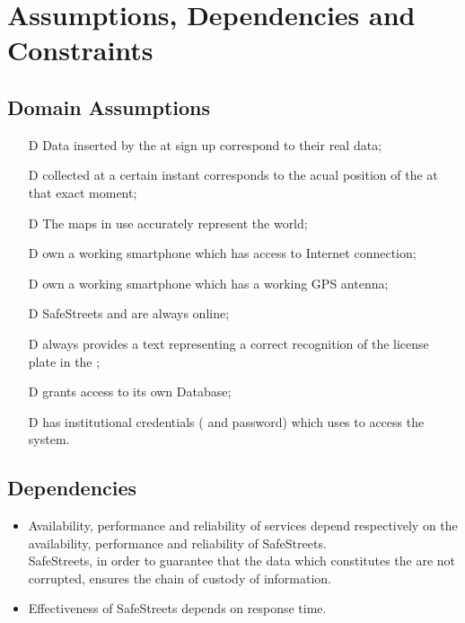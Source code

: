 \documentclass[../../RASD.tex]{subfiles}
\begin{document}
\section{Assumptions, Dependencies and Constraints}
	\subsection{Domain Assumptions}
	 	\begin{itemize}
	 		\item[D\subs{1}]Data inserted by the  at sign up correspond to their real data;
	 		\item[D\subs{2}] collected at a certain instant corresponds to the acual position of the  at that exact moment;
	 		\item[D\subs{3}]The maps in use accurately represent the world;
	 		\item[D\subs{4}] own a working smartphone which has access to Internet connection;
	 		\item[D\subs{5}] own a working smartphone which has a working GPS antenna;
	 		\item[D\subs{6}]SafeStreets and  are always online;
	 		\item[D\subs{7}] always provides a text representing a correct recognition of the license plate in the ;
	 		\item[D\subs{8}] grants access to its own  Database;
	 		\item[D\subs{9}] has institutional credentials ( and password) which uses to access the system.
	 	\end{itemize}
 	
 	\subsection{Dependencies}
 		\begin{itemize}
 		\item Availability, performance and reliability of services depend respectively on the availability, performance and reliability of SafeStreets. \\
 		SafeStreets, in order to guarantee that the data which constitutes the  are not corrupted, ensures the chain of custody of information. 
 		\item Effectiveness of SafeStreets depends on  response time. 
 
 		\end{itemize}
\end{document}
